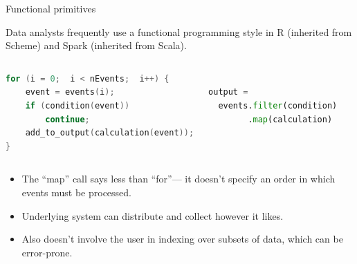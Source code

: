 \documentclass{beamer}
\begin{document}
\begin{frame}[fragile]{Functional primitives}

Data analysts frequently use a functional programming style in R (inherited from Scheme) and Spark (inherited from Scala).

\begin{columns}
\begin{lstlisting}[language=c,frame=single]
for (i = 0;  i < nEvents;  i++) {
    event = events(i);
    if (condition(event))
        continue;
    add_to_output(calculation(event));
}
\end{lstlisting}
\begin{lstlisting}[language=python,frame=single]

output =
  events.filter(condition)
        .map(calculation)


\end{lstlisting}
\end{columns}

\begin{itemize}
\item The ``map'' call says less than ``for''--- it doesn't specify an order in which events must be processed.
\item Underlying system can distribute and collect however it likes.
\item Also doesn't involve the user in indexing over subsets of data, which can be error-prone.
\end{itemize}
\end{frame}
\end{document}
